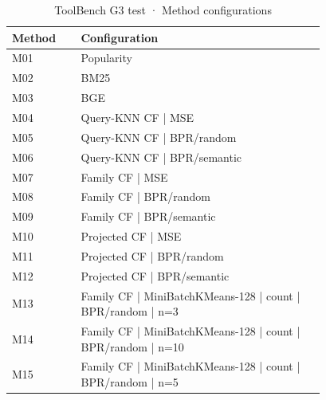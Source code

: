 \begin{table}
\caption{ToolBench G3 test · Method configurations}
\label{tab:ToolBench-G3-test-comparison-comparison-methods}
\begin{tabular}{lp{0.78\linewidth}}
\toprule
Method & Configuration \\
\midrule
M01 & Popularity \\
M02 & BM25 \\
M03 & BGE \\
M04 & Query-KNN CF | MSE \\
M05 & Query-KNN CF | BPR/random \\
M06 & Query-KNN CF | BPR/semantic \\
M07 & Family CF | MSE \\
M08 & Family CF | BPR/random \\
M09 & Family CF | BPR/semantic \\
M10 & Projected CF | MSE \\
M11 & Projected CF | BPR/random \\
M12 & Projected CF | BPR/semantic \\
M13 & Family CF | MiniBatchKMeans-128 | count | BPR/random | n=3 \\
M14 & Family CF | MiniBatchKMeans-128 | count | BPR/random | n=10 \\
M15 & Family CF | MiniBatchKMeans-128 | count | BPR/random | n=5 \\
\bottomrule
\end{tabular}
\end{table}

